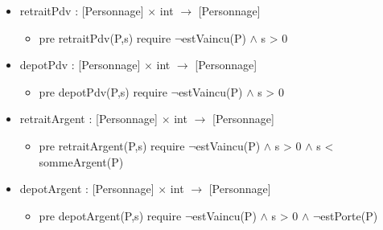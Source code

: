 \documentclass[11pt]{article}
\begin{document}
\begin{itemize}

\item retraitPdv : [Personnage] $\times$ int $\to$ [Personnage]\\
\label{sec-1.6.1.1}

\begin{itemize}

\item pre retraitPdv(P,s) require $\neg$estVaincu(P) $\wedge$ s > 0\\
\label{sec-1.6.1.1.1}

\end{itemize} %

\item depotPdv : [Personnage] $\times$ int $\to$ [Personnage]\\
\label{sec-1.6.1.2}

\begin{itemize}

\item pre depotPdv(P,s) require $\neg$estVaincu(P) $\wedge$ s > 0\\
\label{sec-1.6.1.2.1}


\end{itemize} %

\item retraitArgent : [Personnage] $\times$ int $\to$ [Personnage]\\
\label{sec-1.6.1.3}

\begin{itemize}

\item pre retraitArgent(P,s) require $\neg$estVaincu(P) $\wedge$ s > 0 $\wedge$ s < sommeArgent(P)\\
\label{sec-1.6.1.3.1}

\end{itemize} %

\item depotArgent : [Personnage] $\times$ int $\to$ [Personnage]\\
\label{sec-1.6.1.4}

\begin{itemize}

\item pre depotArgent(P,s) require $\neg$estVaincu(P) $\wedge$ s > 0 $\wedge$ $\neg$estPorte(P)\\
\label{sec-1.6.1.4.1}


\end{itemize} %


\end{itemize}
\end{document}
